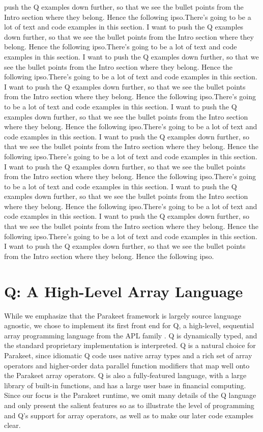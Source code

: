\documentclass[preprint]{sigplanconf}
\begin{document}
push the Q examples down further, so that we see the bullet points from the
Intro section where they belong.  Hence the following ipso.There's going to be a
lot of text and code examples in this section.  I want to
push the Q examples down further, so that we see the bullet points from the
Intro section where they belong.  Hence the following ipso.There's going to be a
lot of text and code examples in this section.  I want to
push the Q examples down further, so that we see the bullet points from the
Intro section where they belong.  Hence the following ipso.There's going to be a
lot of text and code examples in this section.  I want to
push the Q examples down further, so that we see the bullet points from the
Intro section where they belong.  Hence the following ipso.There's going to be a
lot of text and code examples in this section.  I want to
push the Q examples down further, so that we see the bullet points from the
Intro section where they belong.  Hence the following ipso.There's going to be a
lot of text and code examples in this section.  I want to
push the Q examples down further, so that we see the bullet points from the
Intro section where they belong.  Hence the following ipso.There's going to be a
lot of text and code examples in this section.  I want to
push the Q examples down further, so that we see the bullet points from the
Intro section where they belong.  Hence the following ipso.There's going to be a
lot of text and code examples in this section.  I want to
push the Q examples down further, so that we see the bullet points from the
Intro section where they belong.  Hence the following ipso.There's going to be a
lot of text and code examples in this section.  I want to
push the Q examples down further, so that we see the bullet points from the
Intro section where they belong.  Hence the following ipso.There's going to be a
lot of text and code examples in this section.  I want to
push the Q examples down further, so that we see the bullet points from the
Intro section where they belong.  Hence the following ipso.

\section{Q: A High-Level Array Language}
\label{Q}

While we emphasize that the Parakeet framework is largely source language
agnostic, we chose to implement its first front end for Q, a high-level,
sequential array programming language from the APL family \cite{Borr08}.
Q is dynamically typed, and the standard proprietary implementation is
interpreted. Q is a natural choice for Parakeet, since idiomatic Q code uses
native array types and a rich set of array operators and higher-order
data parallel function modifiers that map well onto the Parakeet array
operators. Q is also a fully-featured language, with a large library of built-in
functions, and has a large user base in financial computing. Since our
focus is the Parakeet runtime, we omit many details of the Q language and only
present the salient features so as to illustrate the level of programming
and Q's support for array operators, as well as to make our later code examples
clear.
\end{document}
